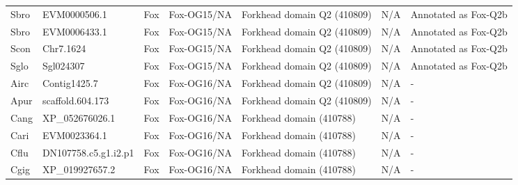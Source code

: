 \documentclass[../main.tex]{subfiles}
\begin{document}
\begin{landscape}
\begin{longtable}{lllllll}
		Sbro           & EVM0000506.1          & Fox            & Fox-OG15/NA         & Forkhead domain Q2 (410809)                 & N/A                                                                    & Annotated as Fox-Q2b \\
		Sbro           & EVM0006433.1          & Fox            & Fox-OG15/NA         & Forkhead domain Q2 (410809)                 & N/A                                                                    & Annotated as Fox-Q2b \\
		Scon           & Chr7.1624             & Fox            & Fox-OG15/NA         & Forkhead domain Q2 (410809)                 & N/A                                                                    & Annotated as Fox-Q2b \\
		Sglo           & Sgl024307             & Fox            & Fox-OG15/NA         & Forkhead domain Q2 (410809)                 & N/A                                                                    & Annotated as Fox-Q2b \\
		Airc           & Contig1425.7          & Fox            & Fox-OG16/NA         & Forkhead domain Q2 (410809)                 & N/A                                                                    & -                    \\
		Apur           & scaffold.604.173      & Fox            & Fox-OG16/NA         & Forkhead domain Q2 (410809)                 & N/A                                                                    & -                    \\
		Cang           & XP\_052676026.1       & Fox            & Fox-OG16/NA         & Forkhead domain (410788)                    & N/A                                                                    & -                    \\
		Cari           & EVM0023364.1          & Fox            & Fox-OG16/NA         & Forkhead domain (410788)                    & N/A                                                                    & -                    \\
		Cflu           & DN107758.c5.g1.i2.p1  & Fox            & Fox-OG16/NA         & Forkhead domain (410788)                    & N/A                                                                    & -                    \\
		Cgig           & XP\_019927657.2       & Fox            & Fox-OG16/NA         & Forkhead domain (410788)                    & N/A                                                                    & -                    \\

\end{longtable}
\end{landscape}
\end{document}
